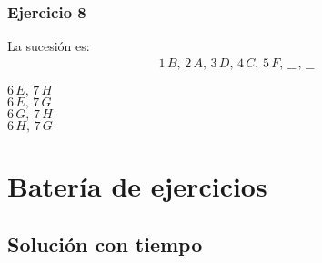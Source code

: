 \begin{frame}
\frametitle{Ejercicio 8}
La sucesión es:
\begin{align*}
1 \, B, \, 2 \, A, \, 3 \, D, \, 4 \, C, \, 5 \, F, \, \_\_ \, , \, \_\_
\end{align*}
\begin{choices}
\choice $6 \, E, \, 7 \, H$ \\
\choice $6 \, E, \, 7 \, G$ \\
\choice $6 \, G, \, 7 \, H$ \\
\choice $6 \, H, \, 7 \, G$
\end{choices}
\pause
{}
\end{frame}

\section{Batería de ejercicios}
\subsection{Solución con tiempo}

